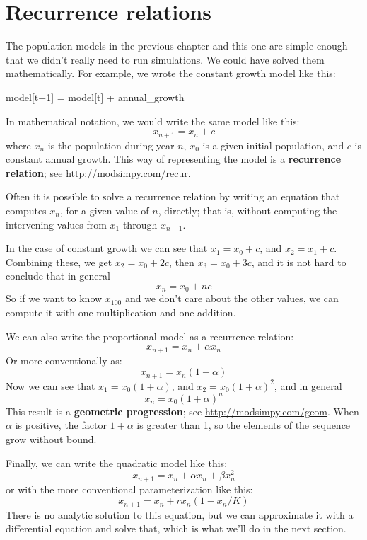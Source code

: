 \documentclass[12pt]{book}
\theoremstyle{exercise}
\begin{document}
\section{Recurrence relations}

The population models in the previous chapter and this one are simple enough that we didn't really need to run simulations.  We could have solved them mathematically.  For example, we wrote the constant growth model like this:

\begin{python}
model[t+1] = model[t] + annual_growth
\end{python}

In mathematical notation, we would write the same model like this:
%
\[ x_{n+1} = x_n + c \]
%
where $x_n$ is the population during year $n$, $x_0$ is a given initial population, and $c$ is constant annual growth.  This way of representing the model is a {\bf recurrence relation}; see \url{http://modsimpy.com/recur}.

Often it is possible to solve a recurrence relation by writing an equation that computes $x_n$, for a given value of $n$, directly; that is, without computing the intervening values from $x_1$ through $x_{n-1}$.

In the case of constant growth we can see that $x_1 = x_0 + c$, and $x_2 = x_1 + c$.  Combining these, we get $x_2 = x_0 + 2c$, then $x_3 = x_0 + 3c$, and it is not hard to conclude that in general
%
\[ x_n = x_0 + nc \]
%
So if we want to know $x_{100}$ and we don't care about the other values, we can compute it with one multiplication and one addition.

We can also write the proportional model as a recurrence relation:
%
\[ x_{n+1} = x_n + \alpha x_n \]
%
Or more conventionally as:
%
\[ x_{n+1} = x_n (1 + \alpha) \]
%
Now we can see that $x_1 = x_0 (1 + \alpha)$, and $x_2 = x_0 (1 + \alpha)^2$, and in general
%
\[ x_n = x_0 (1 + \alpha)^n \]
%
This result is a {\bf geometric progression}; see \url{http://modsimpy.com/geom}.  When $\alpha$ is positive, the factor $1+\alpha$ is greater than 1, so the elements of the sequence grow without bound.

Finally, we can write the quadratic model like this:
%
\[ x_{n+1} = x_n + \alpha x_n + \beta x_n^2 \]
%
or with the more conventional parameterization like this:
%
\[ x_{n+1} = x_n + r x_n (1 - x_n / K) \]
%
There is no analytic solution to this equation, but we can approximate it with a differential equation and solve that, which is what we'll do in the next section.
\end{document}
